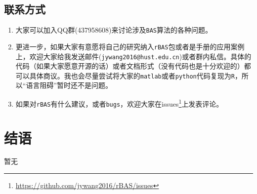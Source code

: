 \documentclass[]{ctexbook}
\renewcommand{\href}[2]{#2\footnote{\url{#1}}}
\begin{document}
\section{联系方式}

\begin{enumerate}
\def\labelenumi{\arabic{enumi}.}
\item
  大家可以加入QQ群(437958608)来讨论涉及\texttt{BAS}算法的各种问题。
\item
  更进一步，如果大家有意愿将自己的研究纳入\texttt{rBAS}包或者是手册的应用案例上，欢迎大家给我发送邮件(\texttt{jywang2016@hust.edu.cn})或者群内私信。具体的代码（如果大家愿意开源的话）或者文档形式（没有代码也是十分欢迎的）都可以具体商议。我也会尽量尝试将大家的\texttt{matlab}或者\texttt{python}代码复现为\texttt{R}，所以``语言阻碍''暂时还不是问题。
\item
  如果对\texttt{rBAS}有什么建议，或者\texttt{bugs}，欢迎大家在\href{https://github.com/jywang2016/rBAS/issues}{issues}上发表评论。
\end{enumerate}

\cleardoublepage 

\appendix {}


\chapter*{结语}


暂无



\backmatter
\printindex
\end{document}
